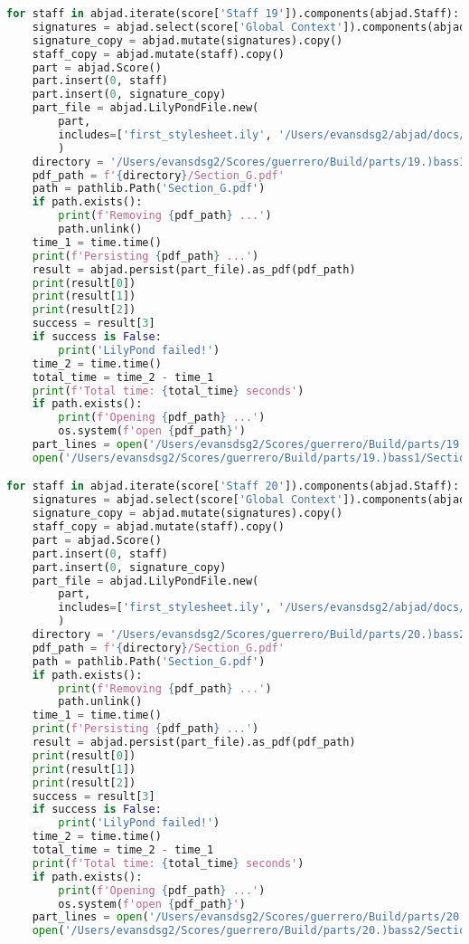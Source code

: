 \begin{lstlisting}[language=Python, caption=Invocation Source Code]
for staff in abjad.iterate(score['Staff 19']).components(abjad.Staff):
    signatures = abjad.select(score['Global Context']).components(abjad.Staff)
    signature_copy = abjad.mutate(signatures).copy()
    staff_copy = abjad.mutate(staff).copy()
    part = abjad.Score()
    part.insert(0, staff)
    part.insert(0, signature_copy)
    part_file = abjad.LilyPondFile.new(
        part,
        includes=['first_stylesheet.ily', '/Users/evansdsg2/abjad/docs/source/_stylesheets/abjad.ily'],
        )
    directory = '/Users/evansdsg2/Scores/guerrero/Build/parts/19.)bass1'
    pdf_path = f'{directory}/Section_G.pdf'
    path = pathlib.Path('Section_G.pdf')
    if path.exists():
        print(f'Removing {pdf_path} ...')
        path.unlink()
    time_1 = time.time()
    print(f'Persisting {pdf_path} ...')
    result = abjad.persist(part_file).as_pdf(pdf_path)
    print(result[0])
    print(result[1])
    print(result[2])
    success = result[3]
    if success is False:
        print('LilyPond failed!')
    time_2 = time.time()
    total_time = time_2 - time_1
    print(f'Total time: {total_time} seconds')
    if path.exists():
        print(f'Opening {pdf_path} ...')
        os.system(f'open {pdf_path}')
    part_lines = open('/Users/evansdsg2/Scores/guerrero/Build/parts/19.)bass1/Section_G.ly').readlines()
    open('/Users/evansdsg2/Scores/guerrero/Build/parts/19.)bass1/Section_G.ly', 'w').writelines(part_lines[15:-1])

for staff in abjad.iterate(score['Staff 20']).components(abjad.Staff):
    signatures = abjad.select(score['Global Context']).components(abjad.Staff)
    signature_copy = abjad.mutate(signatures).copy()
    staff_copy = abjad.mutate(staff).copy()
    part = abjad.Score()
    part.insert(0, staff)
    part.insert(0, signature_copy)
    part_file = abjad.LilyPondFile.new(
        part,
        includes=['first_stylesheet.ily', '/Users/evansdsg2/abjad/docs/source/_stylesheets/abjad.ily'],
        )
    directory = '/Users/evansdsg2/Scores/guerrero/Build/parts/20.)bass2'
    pdf_path = f'{directory}/Section_G.pdf'
    path = pathlib.Path('Section_G.pdf')
    if path.exists():
        print(f'Removing {pdf_path} ...')
        path.unlink()
    time_1 = time.time()
    print(f'Persisting {pdf_path} ...')
    result = abjad.persist(part_file).as_pdf(pdf_path)
    print(result[0])
    print(result[1])
    print(result[2])
    success = result[3]
    if success is False:
        print('LilyPond failed!')
    time_2 = time.time()
    total_time = time_2 - time_1
    print(f'Total time: {total_time} seconds')
    if path.exists():
        print(f'Opening {pdf_path} ...')
        os.system(f'open {pdf_path}')
    part_lines = open('/Users/evansdsg2/Scores/guerrero/Build/parts/20.)bass2/Section_G.ly').readlines()
    open('/Users/evansdsg2/Scores/guerrero/Build/parts/20.)bass2/Section_G.ly', 'w').writelines(part_lines[15:-1])


\end{lstlisting}
